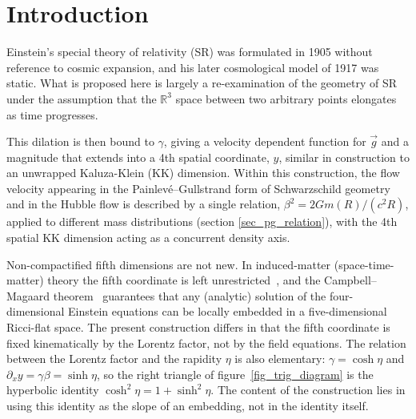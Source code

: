 \documentclass[pdflatex,sn-mathphys-num]{sn-jnl}%
\theoremstyle{thmstyleone}%
\theoremstyle{thmstyletwo}%
\theoremstyle{thmstylethree}%
\begin{document}



\maketitle

\section{Introduction}\label{sec1}

Einstein's special theory of relativity (SR)\cite{einstein1905electrodynamics} was formulated in 1905 without reference to cosmic expansion, and his later cosmological model of 1917 was static\cite{Einstein1917CosmologicalConsiderations, ORaifeartaigh2017EinsteinCosmology, Nussbaumer2014EinsteinStaticToExpanding}. What is proposed here is largely a re-examination of the geometry of SR under the assumption that the $\mathbb{R}^{3}$ space between two arbitrary points elongates as time progresses.

This dilation is then bound to $\gamma$, giving a velocity dependent function for $\vec{g}$ and a magnitude that extends into a 4th spatial coordinate, $y$, similar in construction to an unwrapped Kaluza-Klein (KK) dimension\cite{Kaluza1921, Klein1926}. Within this construction, the flow velocity appearing in the Painlev\'e--Gullstrand form of Schwarzschild geometry and in the Hubble flow is described by a single relation, $\beta^2=2Gm(R)/(c^2R)$, applied to different mass distributions (section \ref{sec_pg_relation}), with the 4th spatial KK dimension acting as a concurrent density axis.


Non-compactified fifth dimensions are not new. In induced-matter (space-time-matter) theory the fifth coordinate is left unrestricted~\cite{Wesson1999STM,OverduinWesson1997}, and the Campbell--Magaard theorem~\cite{Campbell1926Course,Magaard1963} guarantees that any (analytic) solution of the four-dimensional Einstein equations can be locally embedded in a five-dimensional Ricci-flat space. The present construction differs in that the fifth coordinate is fixed kinematically by the Lorentz factor, not by the field equations. The relation between the Lorentz factor and the rapidity $\eta$ is also elementary: $\gamma=\cosh\eta$ and $\partial_x y=\gamma\beta=\sinh\eta$, so the right triangle of figure~\ref{fig_trig_diagram} is the hyperbolic identity $\cosh^2\eta=1+\sinh^2\eta$. The content of the construction lies in using this identity as the slope of an embedding, not in the identity itself.
\end{document}
